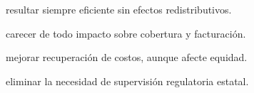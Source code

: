 \begin{opts}
    \item resultar siempre eficiente sin efectos redistributivos.
    \item carecer de todo impacto sobre cobertura y facturación.
    \item mejorar recuperación de costos, aunque afecte equidad.
    \item eliminar la necesidad de supervisión regulatoria estatal.
\end{opts}
